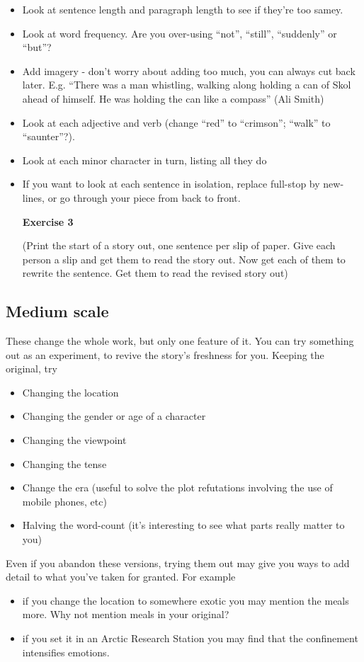 \documentclass[11pt]{article}
\begin{document}
\begin{itemize}
\item Look at sentence length and paragraph length to see if they're too samey.
\item Look at word frequency. Are you over-using ``not'', ``still'', ``suddenly'' or ``but''?
\item Add imagery - don't worry about adding too much, you can always cut back later. E.g. ``There was a man whistling, walking along holding a can of Skol ahead of himself. He was holding the can like a compass'' (Ali Smith)
\item Look at each adjective and verb (change ``red'' to ``crimson''; ``walk'' to ``saunter''?).

\item Look at each minor character in turn, listing all they do

\item  If you want to look at each sentence in isolation,  replace full-stop by new-lines, or go through your piece from back to front.

\textbf{Exercise 3}

(Print the start of a story out, one sentence per slip of paper. Give each person a slip and get them to read the story out. Now get each of them to rewrite the sentence. Get them to read the revised story out) 

\end{itemize}




\subsection*{Medium scale}
These change the whole work, but only one feature of it. You can try something out as an experiment, to revive the story's freshness for you. Keeping the original, try
\begin{itemize}
\item Changing the location 
\item Changing the gender or age of a character
\item Changing the viewpoint
\item Changing the tense
\item Change the era (useful to solve the plot refutations involving the use of mobile phones, etc) 
\item Halving the word-count (it's interesting to see what parts really matter to you)
\end{itemize}
Even if you abandon these versions, trying them out may give you ways to add detail to what you've taken for granted. For example
\begin{itemize}
\item if you change the location to somewhere exotic you may mention the meals more. Why not mention meals in your original?
\item if you set it in an Arctic Research Station you may find that the confinement intensifies emotions. 
\end{itemize}
\end{document}
